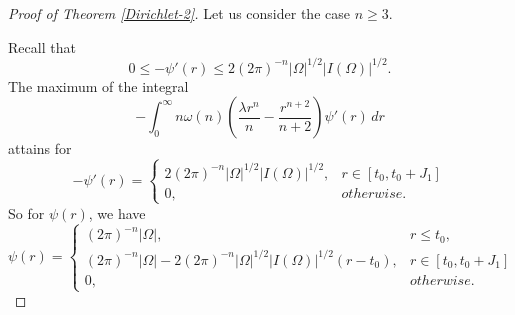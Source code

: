 \documentclass[11pt,twoside, leqno]{article}
\numberwithin{equation}{section}
\begin{document}
\begin{proof}[Proof of Theorem \ref{Dirichlet-2}]
%
%



Let us consider the case $n\ge 3$.
%


Recall that
$$0\le -\psi'(r)\le 2(2\pi)^{-n}|\Omega|^{1/2}|I(\Omega)|^{1/2}.$$
The maximum of the integral
$$-\int_0^\infty n\omega(n)\left(\frac{\lambda r^n}{n} -\frac{r^{n+2}}{n+2}\right) \psi'(r)\,dr$$
attains for
$$
-\psi'(r)=\begin{cases}
2(2\pi)^{-n}|\Omega|^{1/2}|I(\Omega)|^{1/2},&  r\in [t_0,t_0+J_1]\\
0, & otherwise.
\end{cases}$$
So for $\psi(r)$, we have
$$
\psi(r)=\begin{cases}
(2\pi)^{-n}|\Omega|,& r\le t_0,\\
(2\pi)^{-n}|\Omega|-2(2\pi)^{-n}|\Omega|^{1/2}|I(\Omega)|^{1/2}(r-t_0),&  r\in [t_0,t_0+J_1]\\
0, & otherwise.
\end{cases}$$


\end{proof}
\end{document}
